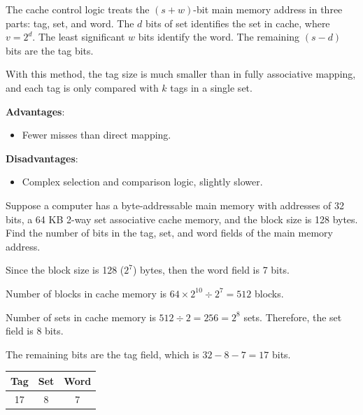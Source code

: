 \begin{enumerate}
    The cache control logic treats the $(s+w)$-bit main memory address in three parts:
    tag, set, and word.
    The $d$ bits of set identifies the set in cache, where $v = 2^d$.
    The least significant $w$ bits identify the word.
    The remaining $(s-d)$ bits are the tag bits.

    With this method, the tag size is much smaller than in fully associative mapping,
    and each tag is only compared with $k$ tags in a single set.

    \begin{multicols}{2}
        \textbf{Advantages}: \begin{itemize}
            \item Fewer misses than direct mapping.
        \end{itemize}
        \columnbreak
        \textbf{Disadvantages}: \begin{itemize}
            \item Complex selection and comparison logic, slightly slower.
        \end{itemize}
    \end{multicols}

\end{enumerate}

\begin{example}
    Suppose a computer has a byte-addressable main memory with addresses of 32 bits,
    a 64 KB 2-way set associative cache memory, and the block size is 128 bytes. Find
    the number of bits in the tag, set, and word fields of the main memory address.

    \begin{solution}
    Since the block size is 128 ($2^7$) bytes, then the word field is 7 bits.

    Number of blocks in cache memory is $64 \times 2^{10} \div 2^7 = 512$ blocks.

    Number of sets in cache memory is $512 \div 2 = 256 = 2^8$ sets. Therefore, the set
    field is 8 bits.

    The remaining bits are the tag field, which is $32 - 8 - 7 = 17$ bits.

    \begin{table}[H]
        \centering
        \begin{tabular}{|c|c|c|}
            \hline
            \textbf{Tag} & \textbf{Set} & \textbf{Word} \\ \hline
            17 & 8 & 7 \\ \hline
        \end{tabular}
    \end{table}
    \end{solution}
\end{example}

